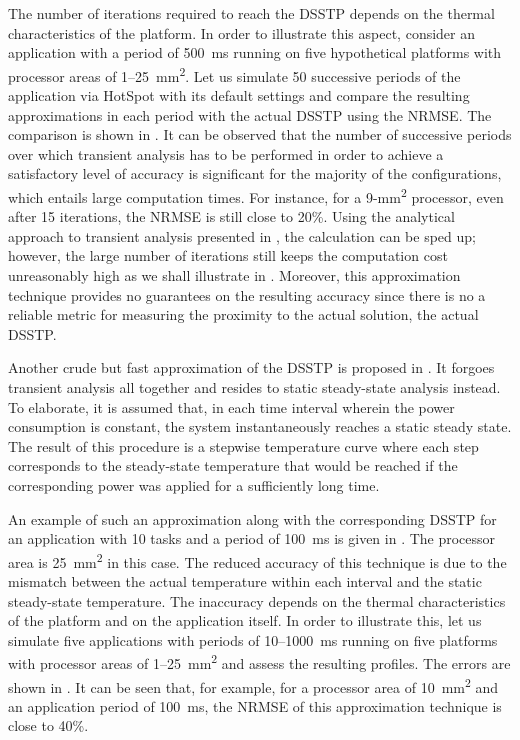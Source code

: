 The number of iterations required to reach the \ac{DSSTP} depends on the thermal
characteristics of the platform. In order to illustrate this aspect, consider an
application with a period of 500~ms running on five hypothetical platforms with
processor areas of 1--25~mm\textsuperscript{2}. Let us simulate 50 successive
periods of the application via HotSpot with its default settings and compare the
resulting approximations in each period with the actual \ac{DSSTP} using the
\ac{NRMSE}. The comparison is shown in . It can be
observed that the number of successive periods over which transient analysis has
to be performed in order to achieve a satisfactory level of accuracy is
significant for the majority of the configurations, which entails large
computation times. For instance, for a 9-mm\textsuperscript{2} processor, even
after 15 iterations, the \ac{NRMSE} is still close to 20\%. Using the analytical
approach to transient analysis presented in , the
calculation can be sped up; however, the large number of iterations still keeps
the computation cost unreasonably high as we shall illustrate in
. Moreover, this approximation technique
provides no guarantees on the resulting accuracy since there is no a reliable
metric for measuring the proximity to the actual solution, the actual
\ac{DSSTP}.

Another crude but fast approximation of the \ac{DSSTP} is proposed in
\cite{huang2009}. It forgoes transient analysis all together and resides to
static steady-state analysis instead. To elaborate, it is assumed that, in each
time interval wherein the power consumption is constant, the system
instantaneously reaches a static steady state. The result of this procedure is a
stepwise temperature curve where each step corresponds to the steady-state
temperature that would be reached if the corresponding power was applied for a
sufficiently long time.

An example of such an approximation along with the corresponding \ac{DSSTP} for
an application with 10 tasks and a period of 100~ms is given in
. The processor area is
25~mm\textsuperscript{2} in this case. The reduced accuracy of this technique is
due to the mismatch between the actual temperature within each interval and the
static steady-state temperature. The inaccuracy depends on the thermal
characteristics of the platform and on the application itself. In order to
illustrate this, let us simulate five applications with periods of 10--1000~ms
running on five platforms with processor areas of 1--25~mm\textsuperscript{2}
and assess the resulting profiles. The errors are shown in
. It can be seen that, for example, for a
processor area of 10~mm\textsuperscript{2} and an application period of 100~ms,
the \ac{NRMSE} of this approximation technique is close to 40\%.

